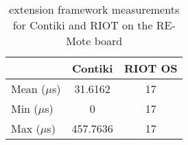 \begin{table}[!ht]
  \centering
  \begin{tabular}{l|c|c}
                & Contiki  & RIOT OS \\ \hline
  Mean ($\mu$s) & 31.6162  & 17      \\
  Min  ($\mu$s) & 0        & 17      \\
  Max  ($\mu$s) & 457.7636 & 17     
  \end{tabular}
  \caption{extension framework measurements for Contiki and RIOT on the RE-Mote board}
  \label{tab:extension-framework-remote}
  \end{table}